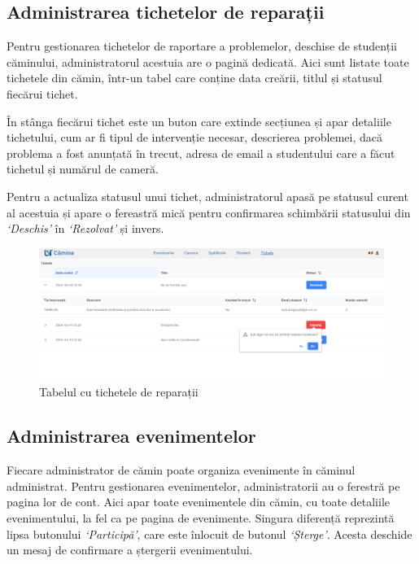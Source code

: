 \documentclass[12pt,a4paper]{report}
\theoremstyle{definition}
\theoremstyle{remark}
\begin{document}
\subsection{Administrarea tichetelor de reparații}

\par Pentru gestionarea tichetelor de raportare a  problemelor, deschise de studenții \textnormal{că\-mi\-nu\-lui}, administratorul acestuia are o pagină dedicată. Aici sunt listate toate tichetele din cămin, într-un tabel care conține  data creării, titlul și statusul fiecărui tichet.

\par În stânga fiecărui tichet este un buton care extinde secțiunea și apar detaliile tichetului, cum ar fi tipul de intervenție necesar, descrierea problemei, dacă problema a fost anunțată în trecut, adresa de email a studentului care a făcut tichetul și numărul de cameră.

\par Pentru a actualiza statusul unui tichet, administratorul apasă pe statusul curent al acestuia și apare o fereastră mică pentru confirmarea schimbării statusului din \textit{`Deschis'} în \textit{`Rezolvat'} și invers.

\begin{figure}[H]
    \centering
    \includegraphics[width=0.8\linewidth]{resurse/ghid_utilizare/schimbare_status_tichet.png}
    \caption{Tabelul cu tichetele de reparații}
\end{figure}

\subsection{Administrarea evenimentelor}

\par Fiecare administrator de cămin poate organiza evenimente în căminul administrat. Pentru gestionarea evenimentelor, administratorii au o ferestră pe pagina lor de cont. Aici apar toate evenimentele din cămin, cu toate detaliile evenimentului, la fel ca pe pagina de evenimente. Singura diferență reprezintă lipsa butonului \textit{`Participă'}, care este înlocuit de butonul \textit{`Șterge'}. Acesta deschide un mesaj de confirmare a ștergerii evenimentului.
\end{document}
